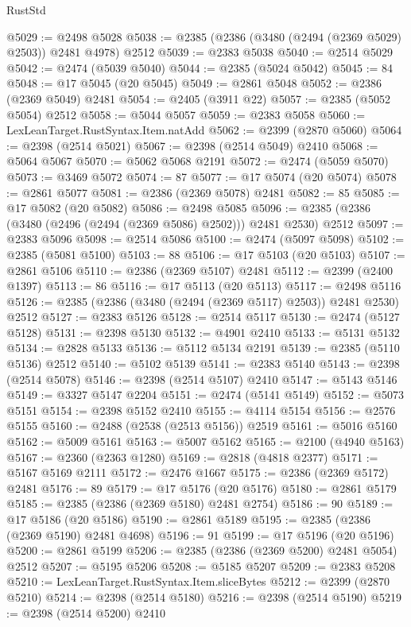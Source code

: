 \begin{lexlean}{RustStd}
\begin{coremodule}
{\begin{coremodule}
{{{{{{{{{{{{{{{{{{{{{{{{{{{{{{{{{{{{{{{{{{{{{{{{{{@5029 := @2498 @5028
@5038 := @2385 (@2386 (@3480 (@2494 (@2369 @5029) @2503)) @2481 @4978) @2512
@5039 := @2383 @5038
@5040 := @2514 @5029
@5042 := @2474 (@5039 @5040)
@5044 := @2385 (@5024 @5042)
@5045 := 84
@5048 := @17 @5045 (@20 @5045)
@5049 := @2861 @5048
@5052 := @2386 (@2369 @5049) @2481
@5054 := @2405 (@3911 @22)
@5057 := @2385 (@5052 @5054) @2512
@5058 := @5044 @5057
@5059 := @2383 @5058
@5060 := LexLeanTarget.RustSyntax.Item.natAdd
@5062 := @2399 (@2870 @5060)
@5064 := @2398 (@2514 @5021)
@5067 := @2398 (@2514 @5049) @2410
@5068 := @5064 @5067
@5070 := @5062 @5068 @2191
@5072 := @2474 (@5059 @5070)
@5073 := @3469 @5072
@5074 := 87
@5077 := @17 @5074 (@20 @5074)
@5078 := @2861 @5077
@5081 := @2386 (@2369 @5078) @2481
@5082 := 85
@5085 := @17 @5082 (@20 @5082)
@5086 := @2498 @5085
@5096 := @2385 (@2386 (@3480 (@2496 (@2494 (@2369 @5086) @2502))) @2481 @2530) @2512
@5097 := @2383 @5096
@5098 := @2514 @5086
@5100 := @2474 (@5097 @5098)
@5102 := @2385 (@5081 @5100)
@5103 := 88
@5106 := @17 @5103 (@20 @5103)
@5107 := @2861 @5106
@5110 := @2386 (@2369 @5107) @2481
@5112 := @2399 (@2400 @1397)
@5113 := 86
@5116 := @17 @5113 (@20 @5113)
@5117 := @2498 @5116
@5126 := @2385 (@2386 (@3480 (@2494 (@2369 @5117) @2503)) @2481 @2530) @2512
@5127 := @2383 @5126
@5128 := @2514 @5117
@5130 := @2474 (@5127 @5128)
@5131 := @2398 @5130
@5132 := @4901 @2410
@5133 := @5131 @5132
@5134 := @2828 @5133
@5136 := @5112 @5134 @2191
@5139 := @2385 (@5110 @5136) @2512
@5140 := @5102 @5139
@5141 := @2383 @5140
@5143 := @2398 (@2514 @5078)
@5146 := @2398 (@2514 @5107) @2410
@5147 := @5143 @5146
@5149 := @3327 @5147 @2204
@5151 := @2474 (@5141 @5149)
@5152 := @5073 @5151
@5154 := @2398 @5152 @2410
@5155 := @4114 @5154
@5156 := @2576 @5155
@5160 := @2488 (@2538 (@2513 @5156)) @2519
@5161 := @5016 @5160
@5162 := @5009 @5161
@5163 := @5007 @5162
@5165 := @2100 (@4940 @5163)
@5167 := @2360 (@2363 @1280)
@5169 := @2818 (@4818 @2377)
@5171 := @5167 @5169 @2111
@5172 := @2476 @1667
@5175 := @2386 (@2369 @5172) @2481
@5176 := 89
@5179 := @17 @5176 (@20 @5176)
@5180 := @2861 @5179
@5185 := @2385 (@2386 (@2369 @5180) @2481 @2754)
@5186 := 90
@5189 := @17 @5186 (@20 @5186)
@5190 := @2861 @5189
@5195 := @2385 (@2386 (@2369 @5190) @2481 @4698)
@5196 := 91
@5199 := @17 @5196 (@20 @5196)
@5200 := @2861 @5199
@5206 := @2385 (@2386 (@2369 @5200) @2481 @5054) @2512
@5207 := @5195 @5206
@5208 := @5185 @5207
@5209 := @2383 @5208
@5210 := LexLeanTarget.RustSyntax.Item.sliceBytes
@5212 := @2399 (@2870 @5210)
@5214 := @2398 (@2514 @5180)
@5216 := @2398 (@2514 @5190)
@5219 := @2398 (@2514 @5200) @2410
}}}}}}}}}}}}}}}}}}}}}}}}}}}}}}}}}}}}}}}}}}}}}}}}}}
\end{coremodule}}
\end{coremodule}
\end{lexlean}
